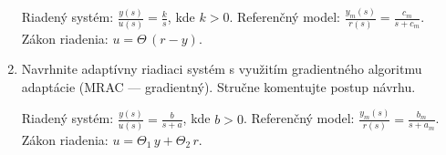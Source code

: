 \documentclass[a4paper, 10pt, ]{article}
\begin{document}
\begin{enumerate}[leftmargin=0pt, labelsep=4mm, itemsep=0pt]
	Riadený systém: $\displaystyle \frac{y(s)}{u(s)} = \frac{k}{s}$, kde $k>0$. Referenčný model: $\displaystyle \frac{y_m(s)}{r(s)} = \frac{c_m}{s + c_m}$. Zákon riadenia: $u = \Theta\,(r - y)$.



	\item Navrhnite adaptívny riadiaci systém s využitím gradientného algoritmu adaptácie (MRAC --- gradientný). Stručne komentujte postup návrhu.

	Riadený systém: $\displaystyle \frac{y(s)}{u(s)} = \frac{b}{s + a}$, kde $b>0$. Referenčný model: $\displaystyle \frac{y_m(s)}{r(s)} = \frac{b_m}{s + a_m}$. Zákon riadenia: $u = \Theta_1 \, y + \Theta_2 \, r$.

\end{enumerate}
\end{document}
